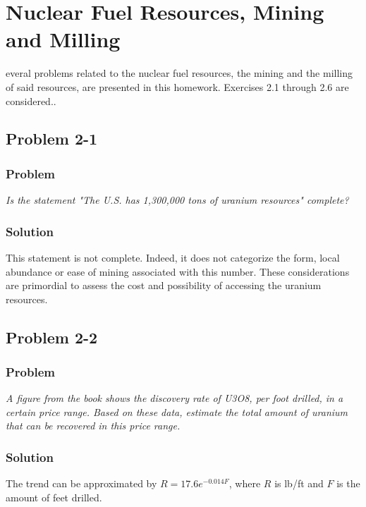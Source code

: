 %
%
\let\textcircled=\pgftextcircled
\chapter{Nuclear Fuel Resources, Mining and Milling}
\label{chap:intro}

everal problems related to the nuclear fuel resources, the mining and the milling of said resources, are presented in this homework. Exercises 2.1 through 2.6 are considered..

\section{Problem 2-1}
\label{prob21}


\subsection{Problem}
\textit{Is the statement "The U.S. has 1,300,000 tons of uranium resources" complete?}

\subsection{Solution}

This statement is not complete. Indeed, it does not categorize the form, local abundance or ease of mining associated with this number. These considerations are primordial to assess the cost and possibility of accessing the uranium resources.

\section{Problem 2-2}
\label{prob22}

\subsection{Problem}
\textit{A figure from the book shows the discovery rate of U3O8, per foot drilled, in a certain price range. Based on these data, estimate the total amount of uranium that can be recovered in this price range.}

\subsection{Solution}

The trend can be approximated by $R = 17.6e^{-0.014F}$, where $R$ is lb/ft and $F$ is the amount of feet drilled.

